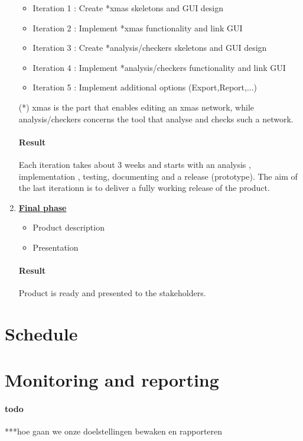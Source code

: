\documentclass[a4paper,11pt,twoside,draft]{article}
\begin{document}
\begin{enumerate}
	\begin{itemize}
		\item Iteration 1 :
			Create *xmas skeletons and GUI design
		\item Iteration 2 :
			Implement *xmas functionality and link GUI
		\item Iteration 3 :
			Create *analysis/checkers skeletons and GUI design
		\item Iteration 4 :
			Implement *analysis/checkers functionality and link GUI
		\item Iteration 5 :
			Implement additional options (Export,Report,...)
	\end{itemize}
	(*) xmas is the part that enables editing an xmas network, while analysis/checkers concerns the tool that analyse and checks such a network.
	
	\paragraph{Result}
	Each iteration takes about 3 weeks and starts with an analysis , implementation , testing, documenting and a release (prototype). The aim of the last iterationn is to deliver a fully working release of the product.
	
	\item \underline{\textbf{Final phase}}
	\begin{itemize}
		\item Product description
		\item Presentation
	\end{itemize}
	\paragraph{Result}
	Product is ready and presented to the stakeholders.
\end{enumerate}
\section{Schedule}

\section{Monitoring and reporting}
\paragraph{todo}
***hoe gaan we onze doelstellingen bewaken en rapporteren
\end{document}
